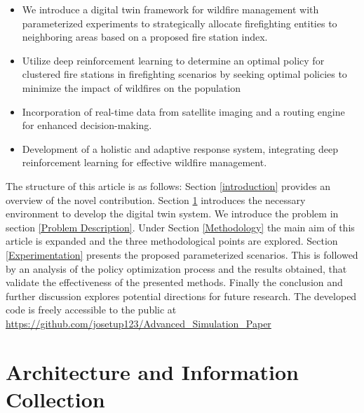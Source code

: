 \documentclass[lettersize,journal]{IEEEtran}
\begin{document}
\begin{itemize}
    \item We introduce a digital twin framework for wildfire management with parameterized experiments to strategically allocate firefighting entities to neighboring areas based on a proposed fire station index.

    \item Utilize deep reinforcement learning to determine an optimal policy for clustered fire stations in firefighting scenarios by seeking optimal policies to minimize the impact of wildfires on the population

    \item Incorporation of real-time data from satellite imaging and a routing engine for enhanced decision-making.
    
    \item Development of a holistic and adaptive response system, integrating deep reinforcement learning for effective wildfire management.
    



    
\end{itemize}


The structure of this article is as follows: Section \ref{introduction} provides an overview of the novel contribution. Section \ref{Architecture and Information Collection} introduces the necessary environment to develop the digital twin system. We introduce the problem in section \ref{Problem Description}. Under Section \ref{Methodology} the main aim of this article is expanded and the three methodological points are explored. Section \ref{Experimentation} presents the proposed parameterized scenarios. This is followed by an analysis of the policy optimization process and the results obtained, that validate the effectiveness of the presented methods. Finally the conclusion and further discussion explores potential directions for future research. The developed code is freely accessible to the public at \url{https://github.com/josetup123/Advanced_Simulation_Paper}

\section{Architecture and Information Collection}\label{Architecture and Information Collection}
  
\end{document}
